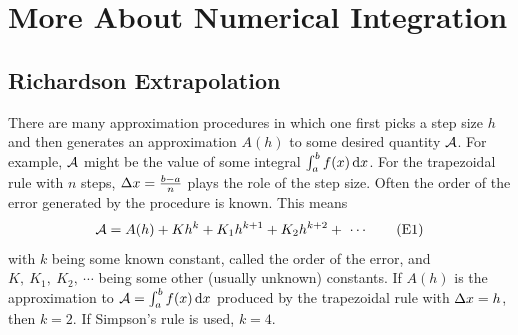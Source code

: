 
\graphicspath{{figures/richardson/}}


\chapter{More About Numerical Integration}\label{ap:RichardsonRomberg}

 
\section{Richardson Extrapolation}\label{ap_Richardson}
There are many approximation procedures in which one first picks a
step size $h$ and then generates an approximation $A(h)$ to some
desired quantity $\mathcal{A}$. For example, $\mathcal{A}$ might be the value of
some integral $\int_a^b f(x)\,\mathrm{d}x$. For the trapezoidal rule with $n$ steps,
$\Delta x=\tfrac{b-a}{n}$ plays the role of the step size.
Often the order of the error generated by the procedure is known. This means
\begin{equation*}
\mathcal{A}=A(h)+Kh^k+K_1h^{k+1}+K_2h^{k+2}+\ \cdots
\tag{E1}\end{equation*}
with $k$ being some known constant, called the order of the error, and $K,\ 
K_1,\ K_2,\ \cdots$ being some other
(usually unknown) constants.  If $A(h)$ is the approximation to 
$\mathcal{A}=\int_a^b f(x)\,\mathrm{d}x$ produced by the trapezoidal rule with $\Delta x=h$, 
then $k=2$. If Simpson's rule is used, $k=4$.

